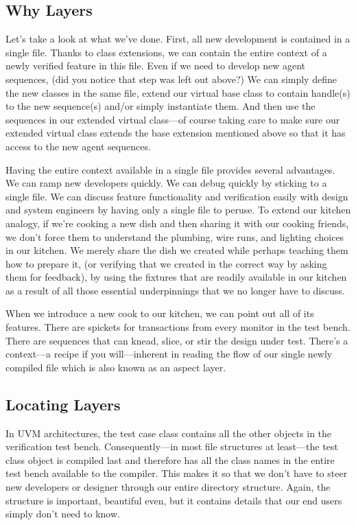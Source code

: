 \documentclass[twocolumn,letterpaper]{IEEEAerospaceCLS}  %
\begin{document}
\subsection{Why Layers}
Let's take a look at what we've done. First, all new development is contained in a single file. Thanks to class extensions, we can contain the entire context of a newly verified feature in this file. Even if we need to develop new agent sequences, (did you notice that step was left out above?) We can simply define the new classes in the same file, extend our virtual base class to contain handle(s) to the new sequence(s) and/or simply instantiate them. And then use the sequences in our extended virtual class—of course taking care to make sure our extended virtual class extends the base extension mentioned above so that it has access to the new agent sequences.

Having the entire context available in a single file provides several advantages.  We can ramp new developers quickly. We can debug quickly by sticking to a single file. We can discuss feature functionality and verification easily with design and system engineers by having only a single file to peruse. To extend our kitchen analogy, if we're cooking a new dish and then sharing it with our cooking friends, we don't force them to understand the plumbing, wire runs, and lighting choices in our kitchen. We merely share the dish we created while perhaps teaching them how to prepare it, (or verifying that we created in the correct way by asking them for feedback), by using the fixtures that are readily available in our kitchen as a result of all those essential underpinnings that we no longer have to discuss.

When we introduce a new cook to our kitchen, we can point out all of its features. There are spickets for transactions from every monitor in the test bench. There are sequences that can knead, slice, or stir the design under test. There's a context—a recipe if you will—inherent in reading the flow of our single newly compiled file which is also known as an aspect layer.

\subsection{Locating Layers}
In UVM architectures, the test case class contains all the other objects in the verification test bench. Consequently—in most file structures at least—the test class object is compiled last and therefore has all the class names in the entire test bench available to the compiler. This makes it so that we don't have to steer new developers or designer through our entire directory structure. Again, the structure is important, beautiful even, but it contains details that our end users simply don't need to know.
\end{document}
